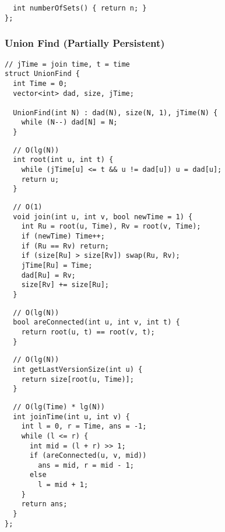 \documentclass[twoside]{article}
\begin{document}
\begin{multicols*}{2}
\begin{verbatim}
  int numberOfSets() { return n; }
};
\end{verbatim}

\subsubsectionfont{\large\bfseries\sffamily\underline}
\subsubsection*{Union Find (Partially Persistent)}
\begin{verbatim}
// jTime = join time, t = time
struct UnionFind {
  int Time = 0;
  vector<int> dad, size, jTime;

  UnionFind(int N) : dad(N), size(N, 1), jTime(N) {
    while (N--) dad[N] = N;
  }
\end{verbatim}
\vspace{-12pt}
\begin{verbatim}
  // O(lg(N))
  int root(int u, int t) {
    while (jTime[u] <= t && u != dad[u]) u = dad[u];
    return u;
  }
\end{verbatim}
\vspace{-12pt}
\begin{verbatim}
  // O(1)
  void join(int u, int v, bool newTime = 1) {
    int Ru = root(u, Time), Rv = root(v, Time);
    if (newTime) Time++;
    if (Ru == Rv) return;
    if (size[Ru] > size[Rv]) swap(Ru, Rv);
    jTime[Ru] = Time;
    dad[Ru] = Rv;
    size[Rv] += size[Ru];
  }
\end{verbatim}
\vspace{-12pt}
\begin{verbatim}
  // O(lg(N))
  bool areConnected(int u, int v, int t) {
    return root(u, t) == root(v, t);
  }
\end{verbatim}
\vspace{-12pt}
\begin{verbatim}
  // O(lg(N))
  int getLastVersionSize(int u) {
    return size[root(u, Time)];
  }
\end{verbatim}
\vspace{-12pt}
\begin{verbatim}
  // O(lg(Time) * lg(N))
  int joinTime(int u, int v) {
    int l = 0, r = Time, ans = -1;
    while (l <= r) {
      int mid = (l + r) >> 1;
      if (areConnected(u, v, mid))
        ans = mid, r = mid - 1;
      else
        l = mid + 1;
    }
    return ans;
  }
};
\end{verbatim}


\end{multicols*}
\end{document}
